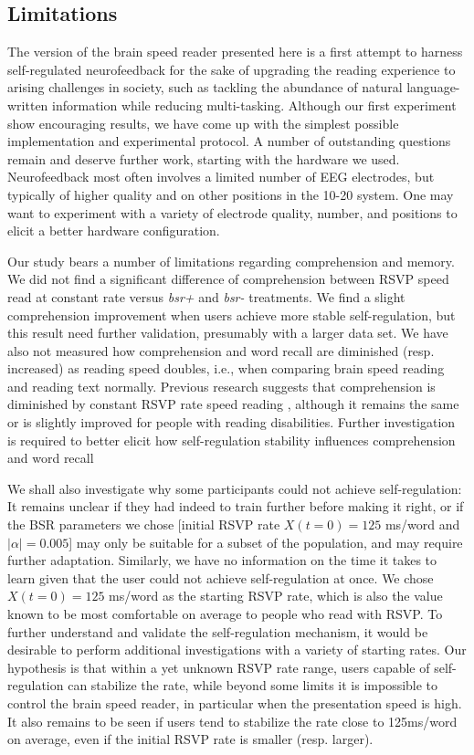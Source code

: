 \subsection{Limitations}
The version of the brain speed reader presented here is a first attempt to harness self-regulated neurofeedback for the sake of upgrading the reading experience to arising challenges in society, such as tackling the abundance of natural language- written information while reducing multi-tasking. Although our first experiment show encouraging results, we have come up with the simplest possible implementation and experimental protocol. A number of outstanding questions remain and deserve further work, starting with the hardware we used. Neurofeedback most often involves a limited number of EEG electrodes, but typically of higher quality and on other positions in the 10-20 system. One may want to experiment with a variety of electrode quality, number, and positions to elicit a better hardware configuration.

Our study bears a number of limitations regarding comprehension and memory. We did not find a significant difference of comprehension between RSVP speed read at constant rate versus {\it bsr+} and {\it bsr-} treatments. We find a slight comprehension improvement when users achieve more stable self-regulation, but this result need further validation, presumably with a larger data set. We have also not measured how comprehension and word recall are diminished (resp. increased) as reading speed doubles, i.e., when comparing brain speed reading and reading text normally. Previous research suggests that comprehension is diminished by constant RSVP rate speed reading \cite{kujala2007phase}, although it remains the same or is slightly improved for people with reading disabilities. Further investigation is required to better elicit how self-regulation stability influences comprehension and word recall

We shall also investigate why some participants could not achieve self-regulation: It remains unclear if they had indeed to train further before making it right, or if the BSR parameters we chose [initial RSVP rate $X(t=0) = 125$ ms/word and $|\alpha| = 0.005$] may only be suitable for a subset of the population, and may require further adaptation. Similarly, we have no information on the time it takes to learn given that the user could not achieve self-regulation at once. We chose $X(t=0) = 125$ ms/word as the starting RSVP rate, which is also the value known to be most comfortable on average to people who read with RSVP. To further understand and validate the self-regulation mechanism, it would be desirable to perform additional investigations with a variety of starting rates. Our hypothesis is that within a yet unknown RSVP rate range, users capable of self-regulation can stabilize the rate, while beyond some limits it is impossible to control the brain speed reader, in particular when the presentation speed is high. It also remains to be seen if users tend to stabilize the rate close to 125ms/word on average, even if the initial RSVP rate is smaller (resp. larger).

